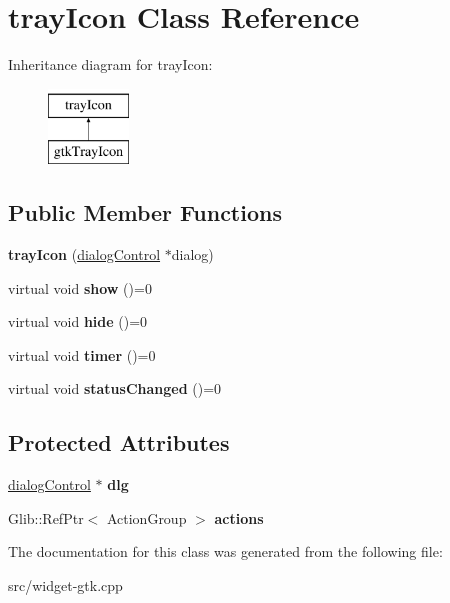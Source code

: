 \hypertarget{classtrayIcon}{\section{tray\-Icon \-Class \-Reference}
\label{classtrayIcon}
}
\-Inheritance diagram for tray\-Icon\-:\begin{figure}[H]
\begin{center}
\leavevmode
\includegraphics[height=2.000000cm]{classtrayIcon}
\end{center}
\end{figure}
\subsection*{\-Public \-Member \-Functions}
\begin{DoxyCompactItemize}
\item 
\hypertarget{classtrayIcon_a6c4884512d12eaa08e2b3e01c156eee1}{{\bfseries tray\-Icon} (\hyperlink{classdialogControl}{dialog\-Control} $\ast$dialog)}\label{classtrayIcon_a6c4884512d12eaa08e2b3e01c156eee1}

\item 
\hypertarget{classtrayIcon_a65be27b0fe8a7d8d82476ed2f9bf4860}{virtual void {\bfseries show} ()=0}\label{classtrayIcon_a65be27b0fe8a7d8d82476ed2f9bf4860}

\item 
\hypertarget{classtrayIcon_a52fca689ecfa1282205c77d70f7299d6}{virtual void {\bfseries hide} ()=0}\label{classtrayIcon_a52fca689ecfa1282205c77d70f7299d6}

\item 
\hypertarget{classtrayIcon_a49426b6d074feaa5674a9033953cadfe}{virtual void {\bfseries timer} ()=0}\label{classtrayIcon_a49426b6d074feaa5674a9033953cadfe}

\item 
\hypertarget{classtrayIcon_a52cc132cef516467b88bb673d8b1200d}{virtual void {\bfseries status\-Changed} ()=0}\label{classtrayIcon_a52cc132cef516467b88bb673d8b1200d}

\end{DoxyCompactItemize}
\subsection*{\-Protected \-Attributes}
\begin{DoxyCompactItemize}
\item 
\hypertarget{classtrayIcon_a8e2b8aed8febe37b0b94a6ec274130ff}{\hyperlink{classdialogControl}{dialog\-Control} $\ast$ {\bfseries dlg}}\label{classtrayIcon_a8e2b8aed8febe37b0b94a6ec274130ff}

\item 
\hypertarget{classtrayIcon_a090069477575d5f22d068b3e44823e82}{\-Glib\-::\-Ref\-Ptr$<$ \-Action\-Group $>$ {\bfseries actions}}\label{classtrayIcon_a090069477575d5f22d068b3e44823e82}

\end{DoxyCompactItemize}


\-The documentation for this class was generated from the following file\-:\begin{DoxyCompactItemize}
\item 
src/widget-\/gtk.\-cpp\end{DoxyCompactItemize}
